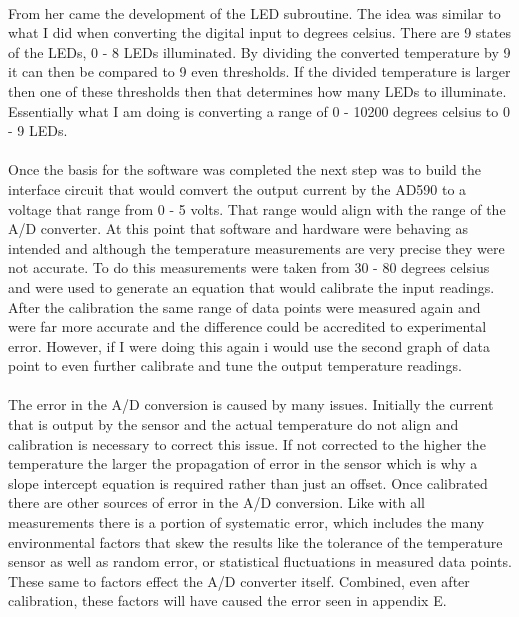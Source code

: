 \documentclass[12pt]{report}
\begin{document}
	\paragraph*{}
		From her came the development of the LED subroutine.  The idea was similar to what I did when converting the digital input to degrees celsius.  There are 9 states of the LEDs, 0 - 8
		LEDs illuminated.  By dividing the converted temperature by 9 it can then be compared to 9 even thresholds.  If the divided temperature is larger then one of these thresholds then 
		that determines how many LEDs to illuminate.  Essentially what I am doing is converting a range of 0 - 10200 degrees celsius to 0 - 9 LEDs.
	\paragraph*{}
		Once the basis for the software was completed the next step was to build the interface circuit that would comvert the output current by the AD590 to a voltage that range from 0 - 
		5 volts.  That range would align with the range of the A/D converter.  At this point that software and hardware were behaving as intended and although the temperature 
		measurements are very precise they were not accurate.  To do this measurements were taken from 30 - 80 degrees celsius and were used to generate an equation that would 
		calibrate the input readings.  After the calibration the same range of data points were measured again and were far more accurate and the difference could be accredited to 
		experimental error.  However, if I were doing this again i would use the second graph of data point to even further calibrate and tune the output temperature readings.
	\paragraph*{}
		The error in the A/D conversion is caused by many issues.  Initially the current that is output by the sensor and the actual temperature do not align and calibration is necessary to 
		correct this issue.  If not corrected to the higher the temperature the larger the propagation of error in the sensor which is why a slope intercept equation is required rather than 
		just an offset.  Once calibrated there are other sources of error in the A/D conversion.  Like with all measurements there is a portion of systematic error, which includes the many 
		environmental factors that skew the results like the tolerance of the temperature sensor as well as random error, or statistical fluctuations in measured data points.  These same to 
		factors effect the A/D converter itself.  Combined, even after calibration, these factors will have caused the error seen in appendix E.
\end{document}
